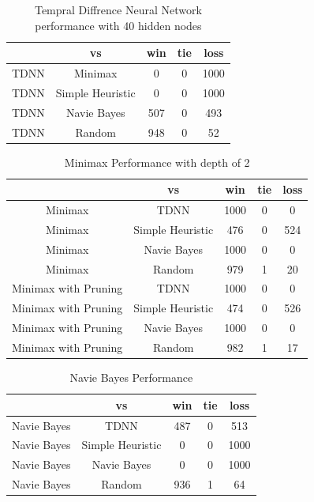\documentclass[12pt,letterpaper]{article}
\begin{document}
\begin{table}
\begin{center}
\begin{tabular}{|c||c|c|c|c|}
\hline
& vs & win & tie & loss\\
\hline \hline
TDNN & Minimax & 0 & 0 & 1000\\
\hline 
TDNN & Simple Heuristic & 0 & 0 & 1000\\
\hline 
TDNN & Navie Bayes & 507 & 0 & 493\\
\hline 
TDNN & Random & 948 & 0 & 52\\
\hline 
\end{tabular}
\end{center}
\caption{Tempral Diffrence Neural Network performance with 40 hidden nodes}
\label{sometable}
\end{table}

\begin{table}
\begin{center}
\begin{tabular}{|c||c|c|c|c|}
\hline
& vs & win & tie & loss\\
\hline \hline
Minimax & TDNN & 1000 & 0 & 0\\
\hline 
Minimax & Simple Heuristic & 476 & 0 & 524\\
\hline 
Minimax & Navie Bayes & 1000 & 0 & 0\\
\hline 
Minimax & Random & 979 & 1 & 20\\
\hline 
Minimax with Pruning & TDNN & 1000 & 0 & 0\\
\hline 
Minimax with Pruning & Simple Heuristic & 474 & 0 & 526\\
\hline 
Minimax with Pruning & Navie Bayes & 1000 & 0 & 0\\
\hline 
Minimax with Pruning & Random & 982 & 1 & 17\\
\hline 
\end{tabular}
\end{center}
\caption{Minimax Performance with depth of 2}
\label{sometable}
\end{table}


\begin{table}
\begin{center}
\begin{tabular}{|c||c|c|c|c|}
\hline
& vs & win & tie & loss\\
\hline \hline
Navie Bayes & TDNN & 487 & 0 & 513\\
\hline 
Navie Bayes & Simple Heuristic & 0 & 0 & 1000\\
\hline 
Navie Bayes & Navie Bayes & 0 & 0 & 1000\\
\hline 
Navie Bayes & Random & 936 & 1 & 64\\
\hline 
\end{tabular}
\end{center}
\caption{Navie Bayes Performance}
\label{sometable}
\end{table}
\end{document}
